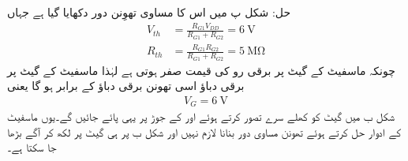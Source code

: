 حل:	شکل  پ میں اس کا مساوی تھوِنن دور دکھایا گیا ہے جہاں
\begin{align*}
V_{th}&=\frac{R_{G1} V_{DD}}{R_{G1}+R_{G2}}=\SI{6}{\volt}\\
R_{th}&=\frac{R_{G1} R_{G2}}{R_{G1}+R_{G2}}=\SI{5}{\mega \ohm}
\end{align*}
چونکہ ماسفیٹ کے گیٹ پر برقی رو کی قیمت صفر ہوتی ہے    لہٰذا ماسفیٹ کے گیٹ پر برقی دباؤ اسی تھونن برقی دباؤ کے برابر ہو گا یعنی
\begin{align*}
V_G=\SI{6}{\volt}
\end{align*}
شکل  ب میں گیٹ کو کھلے سرے تصور کرتے ہوئے  اور  کے جوڑ پر یہی  پائے جائیں گے۔یوں ماسفیٹ کے ادوار حل کرتے ہوئے تھونن مساوی دور بنانا لازم نہیں اور شکل  ب پر ہی گیٹ پر  لکھ کر آگے بڑھا جا سکتا ہے۔

